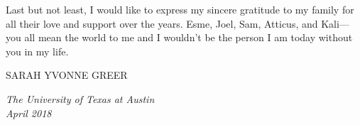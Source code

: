 Last but not least, I would like to express my sincere gratitude to my family for all their love and support over the years.
Esme, Joel, Sam, Atticus, and Kali---you all mean the world to me and I wouldn't be the person I am today without you in my life.
\begin{flushright}
SARAH YVONNE GREER
\end{flushright}

\noindent \emph{The University of Texas at Austin}\\
\noindent \emph{April 2018} \\ \\

